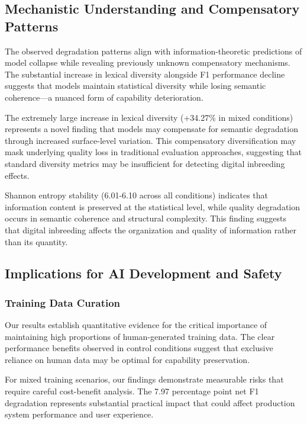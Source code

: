\documentclass{article}
\begin{document}
\subsection{Mechanistic Understanding and Compensatory Patterns}

The observed degradation patterns align with information-theoretic predictions of model collapse while revealing previously unknown compensatory mechanisms. The substantial increase in lexical diversity alongside F1 performance decline suggests that models maintain statistical diversity while losing semantic coherence—a nuanced form of capability deterioration.

The extremely large increase in lexical diversity (+34.27\% in mixed conditions) represents a novel finding that models may compensate for semantic degradation through increased surface-level variation. This compensatory diversification may mask underlying quality loss in traditional evaluation approaches, suggesting that standard diversity metrics may be insufficient for detecting digital inbreeding effects.

Shannon entropy stability (6.01-6.10 across all conditions) indicates that information content is preserved at the statistical level, while quality degradation occurs in semantic coherence and structural complexity. This finding suggests that digital inbreeding affects the organization and quality of information rather than its quantity.

\subsection{Implications for AI Development and Safety}

\subsubsection{Training Data Curation}

Our results establish quantitative evidence for the critical importance of maintaining high proportions of human-generated training data. The clear performance benefits observed in control conditions suggest that exclusive reliance on human data may be optimal for capability preservation.

For mixed training scenarios, our findings demonstrate measurable risks that require careful cost-benefit analysis. The 7.97 percentage point net F1 degradation represents substantial practical impact that could affect production system performance and user experience.
\end{document}

